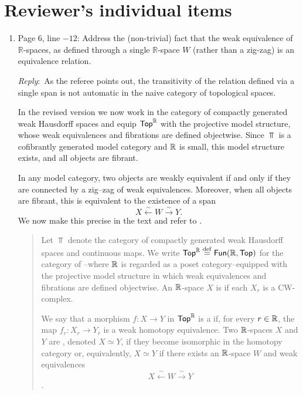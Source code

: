\documentclass{amsart}
\newcommand{\ar}{\medskip\noindent\textit{Reply}:\ }
\begin{document}
	\section{Reviewer's individual items}

	\begin{enumerate}
		\item Page 6, line $-12$: Address the (non-trivial) fact that the weak equivalence of $\mathbb{R}$-spaces, as defined through a single $\mathbb{R}$-space $W$ (rather than a zig-zag) is an equivalence relation.

		\ar As the referee points out, the transitivity of the relation defined via a single span is not automatic in the naive category of topological spaces.

		In the revised version we now work in the category of compactly generated weak Hausdorff spaces and equip $\mathsf{Top}^{\mathbb{R}}$ with the projective model structure, whose weak equivalences and fibrations are defined objectwise. Since $\Top$ is a cofibrantly generated model category and $\mathbb{R}$ is small, this model structure exists, and all objects are fibrant.

		In any model category, two objects are weakly equivalent if and only if they are connected by a zig--zag of weak equivalences. Moreover, when all objects are fibrant, this is equivalent to the existence of a span
		\[
		X \xleftarrow{\sim} W \xrightarrow{\sim} Y.
		\]
		We now make this precise in the text and refer to \cite[\S2.4]{blumberg2023interleaving}.

		\medskip
		\begin{quote}
			Let $\Top$ denote the category of compactly generated weak Hausdorff spaces and continuous maps.
			We write $\mathsf{Top}^{\mathbb{R}} \stackrel{\mathrm{def}}{=} \mathsf{Fun}(\mathbb{R},\mathsf{Top})$ for the category of --where $\mathbb{R}$ is regarded as a poset category--equipped with the projective model structure in which weak equivalences and fibrations are defined objectwise.
			An $\mathbb{R}$-space $X$ is  if each $X_r$ is a CW-complex.

			We say that a morphism $f \colon X \to Y$ in $\mathsf{Top}^{\mathbb{R}}$ is a  if, for every $r \in \mathbb{R}$, the map $f_r \colon X_r \to Y_r$ is a weak homotopy equivalence.
			Two $\mathbb{R}$-spaces $X$ and $Y$ are , denoted $X \simeq Y$, if they become isomorphic in the homotopy category or, equivalently, $X \simeq Y$ if there exists an $\mathbb{R}$-space $W$ and weak equivalences
			\[
			X \xleftarrow{\ \sim\ } W \xrightarrow{\ \sim\ } Y
			\]
			\cite[\S2.4]{blumberg2023interleaving}.
		\end{quote}


\end{enumerate}
\end{document}
